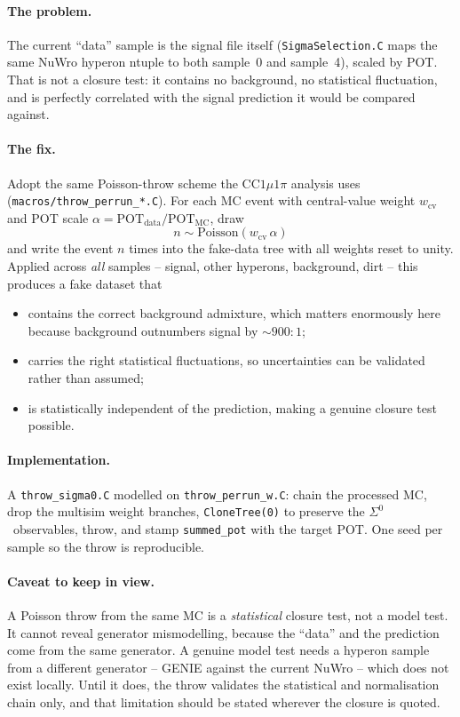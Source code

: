 \documentclass[11pt,a4paper]{article}
\newcommand{\Szero}{\ensuremath{\Sigma^{0}}}
\begin{document}
\paragraph{The problem.} The current ``data'' sample is the signal file itself
(\texttt{SigmaSelection.C} maps the same NuWro hyperon ntuple to both sample~0 and
sample~4), scaled by POT. That is not a closure test: it contains no background, no
statistical fluctuation, and is perfectly correlated with the signal prediction it
would be compared against.

\paragraph{The fix.} Adopt the same Poisson-throw scheme the CC$1\mu1\pi$ analysis
uses (\texttt{macros/throw\_perrun\_*.C}). For each MC event with central-value
weight $w_{\mathrm{cv}}$ and POT scale $\alpha = \mathrm{POT}_{\mathrm{data}} /
\mathrm{POT}_{\mathrm{MC}}$, draw
\begin{equation}
  n \sim \mathrm{Poisson}\!\left( w_{\mathrm{cv}}\,\alpha \right)
\end{equation}
and write the event $n$ times into the fake-data tree with all weights reset to
unity. Applied across \emph{all} samples -- signal, other hyperons, background,
dirt -- this produces a fake dataset that
\begin{itemize}
  \item contains the correct background admixture, which matters enormously here
        because background outnumbers signal by $\sim\!900{:}1$;
  \item carries the right statistical fluctuations, so uncertainties can be
        validated rather than assumed;
  \item is statistically independent of the prediction, making a genuine closure
        test possible.
\end{itemize}

\paragraph{Implementation.} A \texttt{throw\_sigma0.C} modelled on
\texttt{throw\_perrun\_w.C}: chain the processed MC, drop the multisim weight
branches, \texttt{CloneTree(0)} to preserve the \Szero\ observables, throw, and
stamp \texttt{summed\_pot} with the target POT. One seed per sample so the throw is
reproducible.

\paragraph{Caveat to keep in view.} A Poisson throw from the same MC is a
\emph{statistical} closure test, not a model test. It cannot reveal generator
mismodelling, because the ``data'' and the prediction come from the same generator.
A genuine model test needs a hyperon sample from a different generator -- GENIE
against the current NuWro -- which does not exist locally. Until it does, the
throw validates the statistical and normalisation chain only, and that limitation
should be stated wherever the closure is quoted.
\end{document}
